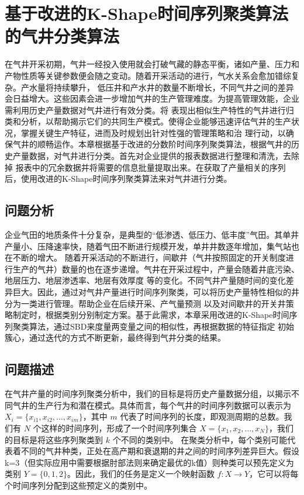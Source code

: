 \chapter{基于改进的K-Shape时间序列聚类算法的气井分类算法}
在气井开采初期，气井一经投入使用就会打破气藏的静态平衡，诸如产量、压力和产物性质等关键参数便会随之变动。随着开采活动的进行，气水关系会愈加错综复杂。产水量将持续攀升，
低压井和产水井的数量不断增长，不同气井之间的差异会日益增大。这些因素会进一步增加气井的生产管理难度。为提高管理效能，企业需利用历史产量数据对气井进行有效分类。将
表现出相似生产特性的气井进行归类和分析，以帮助揭示它们的共同生产模式。使得企业能够迅速评估气井的生产状况，掌握关键生产特征，进而及时规划出针对性强的管理策略和治
理行动，以确保气井的顺畅运作。本章根据基于改进的分数阶时间序列聚类算法，根据气井的历史产量数据，对气井进行分类。首先对企业提供的报表数据进行整理和清洗，去除掉
报表中的冗余数据并将需要的信息批量提取出来。在获取了产量相关的序列后，使用改进的K-Shape时间序列聚类算法来对气井进行分类。
\section{问题分析}
企业气田的地质条件十分复杂，是典型的“低渗透、低压力、低丰度”气田。其单井产量小、压降速率快，随着气田不断进行规模开发，单井井数逐年增加，集气站也在不断的增大。
随着开采活动的不断进行，间歇井（气井按照固定的开关制度进行生产的气井）数量的也在逐步递增。气井在开采过程中，产量会随着井底污染、地层压力、地层渗透率、地层有效厚度
等的变化。不同气井产量随时间的变化差异巨大。因此，通过对气井产量进行时间序列聚类，可以将历史产量特性相似的井分为一类进行管理。帮助企业在后续开采、产气量预测
以及对间歇井的开关井策略制定时，根据类别分别制定方案。基于此需求，本章采用改进的K-Shape时间序列聚类算法，通过SBD来度量两变量之间的相似性，再根据数据的特征指定
初始簇心，通过迭代的方式不断更新，最终得到气井分类的结果。
\section{问题描述}
在气井产量的时间序列聚类分析中，我们的目标是将历史产量数据分组，以揭示不同气井的生产行为和潜在模式。具体而言，每个气井的时间序列数据可以表示为 \( X_i = \{x_{i1}, x_{i2}, \ldots, x_{im}\} \)，其中 \( m \) 代表了时间序列的长度，即观测周期的总数。我们有 \( N \) 个这样的时间序列，形成了一个时间序列集合 \( X = \{x_1, x_2, \ldots, x_N\} \)，我们的目标是将这些序列聚类到 \( k \) 个不同的类别中。
在聚类分析中，每个类别可能代表着不同的气井种类，正处在高产期和衰退期的井之间的时间序列差异巨大。假设k=3（但实际应用中需要根据肘部法则来确定最优的k值）则种类可以预先定义为类别 \( Y = \{0,1,2\} \)。因此，我们的任务是定义一个映射函数 \( f: X \to Y \)，它可以将每个时间序列分配到这些预定义的类别中。
